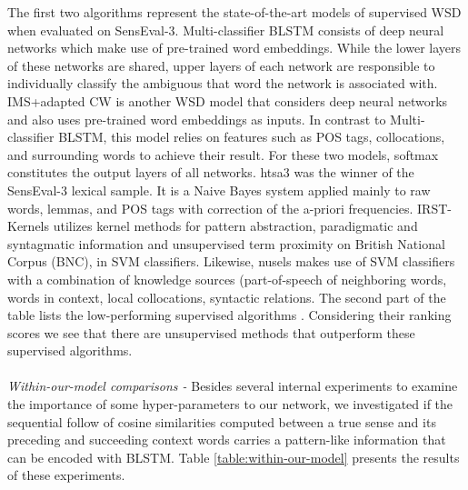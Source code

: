 \documentclass{llncs}
\begin{document}
The first two algorithms represent the state-of-the-art models of supervised WSD when evaluated on SensEval-3. Multi-classifier BLSTM \cite{kaageback2016word} consists of deep neural networks which make use of pre-trained word embeddings. While the lower layers of these networks are shared, upper layers of each network are responsible to individually classify the ambiguous that word the network is associated with. IMS+adapted CW \cite{taghipour2015semi} is another WSD model that considers deep neural networks and also uses pre-trained word embeddings as inputs. In contrast to  Multi-classifier BLSTM, this model relies on features such as POS tags, collocations, and surrounding words to achieve their result. For these two models, softmax constitutes the output layers of all networks. htsa3 \cite{grozea2004finding} was the winner of the SensEval-3 lexical sample. It is a Naive Bayes system applied mainly to raw words, lemmas, and POS tags with correction of the a-priori frequencies. IRST-Kernels \cite{strapparava2004pattern} utilizes kernel methods for pattern abstraction, paradigmatic and syntagmatic information and unsupervised term proximity on British National Corpus (BNC), in SVM classifiers. Likewise, nusels \cite{lee2004supervised} makes use of SVM classifiers with a combination of knowledge sources (part-of-speech of neighboring words, words in context, local collocations, syntactic relations. The second part of the table lists the low-performing supervised algorithms \cite{mihalcea2004senseval}. Considering their ranking scores we see that there are unsupervised methods that outperform these supervised algorithms. 
\\
\\
\textit{Within-our-model comparisons - }Besides several internal experiments to examine the importance of some hyper-parameters to our network, we investigated if the sequential follow of cosine similarities computed between a true sense and its preceding and succeeding context words carries a pattern-like information that can be encoded with BLSTM. Table \ref{table:within-our-model} presents the results of these experiments.
\end{document}

